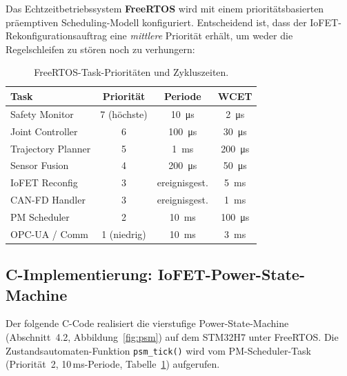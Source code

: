 ﻿\documentclass[a4paper,12pt]{scrreprt}
\theoremstyle{definition}
\begin{document}
Das Echtzeitbetriebssystem \textbf{FreeRTOS} wird mit einem
prioritätsbasierten präemptiven Scheduling-Modell konfiguriert.
Entscheidend ist, dass der IoFET-Rekonfigurationsauftrag eine
\emph{mittlere} Priorität erhält, um weder die Regelschleifen
zu stören noch zu verhungern:

\begin{table}[H]
\centering
\caption{FreeRTOS-Task-Prioritäten und Zykluszeiten.}
\label{tab:freertos}
\small
\begin{tabular}{|l|c|c|c|}
\hline
\rowcolor{mcured!20}
\textbf{Task} & \textbf{Priorität} & \textbf{Periode} & \textbf{WCET} \\
\hline
Safety Monitor & 7 (höchste) & \SI{10}{\micro\second} & \SI{2}{\micro\second} \\
\hline
Joint Controller & 6 & \SI{100}{\micro\second} & \SI{30}{\micro\second} \\
\hline
Trajectory Planner & 5 & \SI{1}{\milli\second} & \SI{200}{\micro\second} \\
\hline
Sensor Fusion & 4 & \SI{200}{\micro\second} & \SI{50}{\micro\second} \\
\hline
IoFET Reconfig & 3 & ereignisgest. & \SI{5}{\milli\second} \\
\hline
CAN-FD Handler & 3 & ereignisgest. & \SI{1}{\milli\second} \\
\hline
PM Scheduler & 2 & \SI{10}{\milli\second} & \SI{100}{\micro\second} \\
\hline
OPC-UA / Comm & 1 (niedrig) & \SI{10}{\milli\second} & \SI{3}{\milli\second} \\
\hline
\end{tabular}
\end{table}

\subsection{C-Implementierung: IoFET-Power-State-Machine}

Der folgende C-Code realisiert die vierstufige Power-State-Machine
(Abschnitt~4.2, Abbildung~\ref{fig:psm}) auf dem STM32H7 unter
FreeRTOS. Die Zustandsautomaten-Funktion \texttt{psm\_tick()} wird
vom PM-Scheduler-Task (Priorität~2, 10\,ms-Periode,
Tabelle~\ref{tab:freertos}) aufgerufen.
\end{document}
